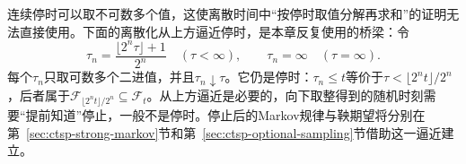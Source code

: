 连续停时可以取不可数多个值，这使离散时间中“按停时取值分解再求和”的证明无法直接使用。下面的离散化从上方逼近停时，是本章反复使用的桥梁：令
\begin{equation}
  \tau_n=\frac{\lfloor2^n\tau\rfloor+1}{2^n}\quad(\tau<\infty),\qquad\tau_n=\infty\quad(\tau=\infty).
  \label{eq:ctsp-dyadic-stopping}
\end{equation}
每个$\tau_n$只取可数多个二进值，并且$\tau_n\downarrow\tau$。它仍是停时：$\tau_n\leq t$等价于$\tau<\lfloor2^nt\rfloor/2^n$，后者属于$\mathcal F_{\lfloor2^nt\rfloor/2^n}\subseteq\mathcal F_t$。从上方逼近是必要的，向下取整得到的随机时刻需要“提前知道”停止，一般不是停时。停止后的Markov规律与鞅期望将分别在第~\ref{sec:ctsp-strong-markov}节和第~\ref{sec:ctsp-optional-sampling}节借助这一逼近建立。
